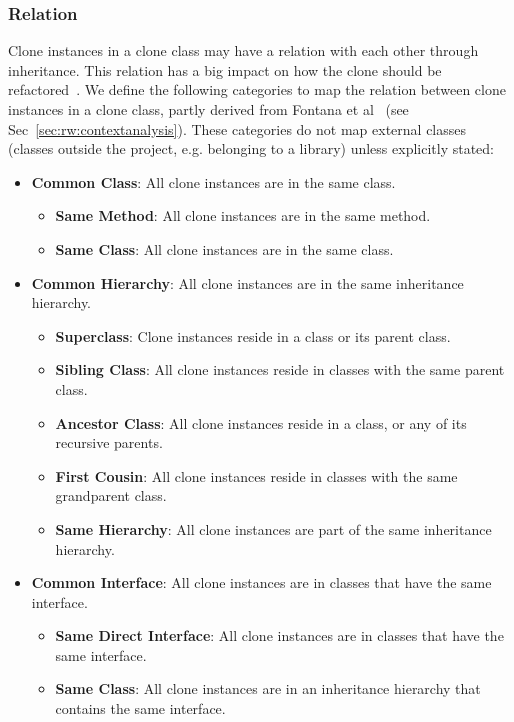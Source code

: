 \documentclass[a4paper,UKenglish,cleveref, autoref, thm-restate,authorcolumns]{lipics-v2019}
\begin{document}
\subsubsection{Relation}\label{sec:relation}
Clone instances in a clone class may have a relation with each other through inheritance. This relation has a big impact on how the clone should be refactored~\cite{fontana2015duplicated}. We define the following categories to map the relation between clone instances in a clone class, partly derived from Fontana et al~\cite{fontana2015duplicated} (see Sec~\ref{sec:rw:contextanalysis}). These categories do not map external classes (classes outside the project, e.g. belonging to a library) unless explicitly stated:
\begin{itemize}
    \item \textbf{Common Class}: All clone instances are in the same class.
    \begin{itemize}
        \item \textbf{Same Method}: All clone instances are in the same method.
        \item \textbf{Same Class}: All clone instances are in the same class.
    \end{itemize}
    \item \textbf{Common Hierarchy}: All clone instances are in the same inheritance hierarchy.
    \begin{itemize}
        \item \textbf{Superclass}: Clone instances reside in a class or its parent class.
        \item \textbf{Sibling Class}: All clone instances reside in classes with the same parent class.
        \item \textbf{Ancestor Class}: All clone instances reside in a class, or any of its recursive parents.
        \item \textbf{First Cousin}: All clone instances reside in classes with the same grandparent class.
        \item \textbf{Same Hierarchy}: All clone instances are part of the same inheritance hierarchy.
    \end{itemize}
    \item \textbf{Common Interface}: All clone instances are in classes that have the same interface.
    \begin{itemize}
        \item \textbf{Same Direct Interface}: All clone instances are in classes that have the same interface.
        \item \textbf{Same Class}: All clone instances are in an inheritance hierarchy that contains the same interface.

\end{itemize}
\end{itemize}
\end{document}
